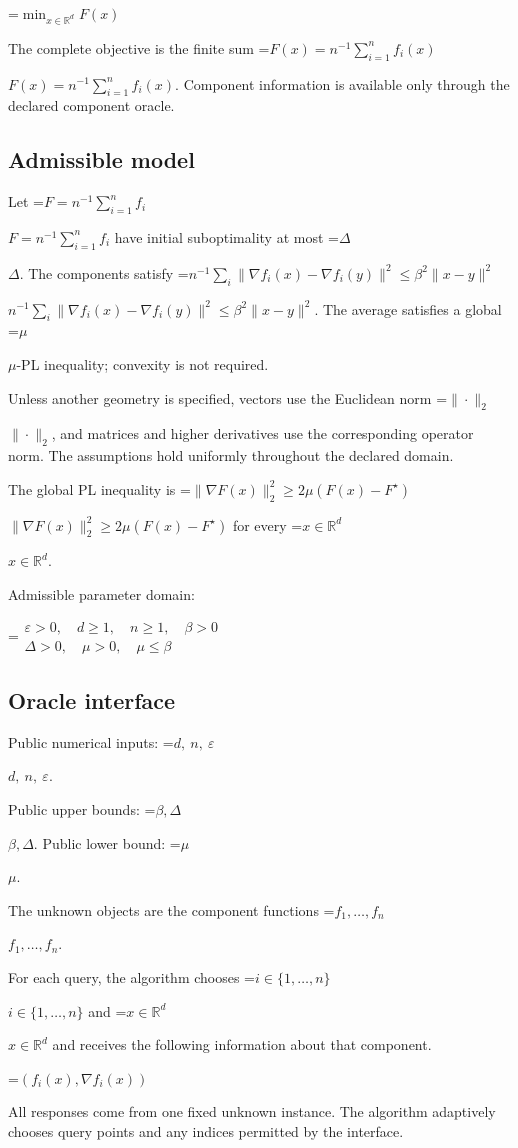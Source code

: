 \documentclass[10pt,a4paper]{article}
\newcommand{\AtlasMath}[1]{\par\begingroup\centering\setbox0=\hbox{$\displaystyle #1$}\ifdim\wd0>1.4\linewidth\typeout{ATLAS WIDE FORMULA: \the\wd0}\fi\ifdim\wd0>\linewidth\resizebox{\linewidth}{!}{\box0}\else\box0\fi\par\endgroup}
\newcommand{\AtlasInlineMath}[1]{\begingroup\setbox0=\hbox{$#1$}\ifdim\wd0>.4\linewidth\endgroup\AtlasMath{#1}\else\endgroup$#1$\fi}
\begin{document}
\AtlasMath{\min_{x\in \mathbb{R}^d}F(x)}


The complete objective is the finite sum \AtlasInlineMath{F(x)=n^{-1}\sum_{i=1}^n f_i(x)}. Component information is available only through the declared component oracle.

\subsection{Admissible model}
Let \AtlasInlineMath{F=n^{-1}\sum_{i=1}^n f_i} have initial suboptimality at most \AtlasInlineMath{\Delta}. The components satisfy \AtlasInlineMath{n^{-1}\sum_i\|\nabla f_i(x)-\nabla f_i(y)\|^2\le\beta^2\|x-y\|^2}. The average satisfies a global \AtlasInlineMath{\mu}-PL inequality; convexity is not required.

Unless another geometry is specified, vectors use the Euclidean norm \AtlasInlineMath{\|\cdot\|_2}, and matrices and higher derivatives use the corresponding operator norm. The assumptions hold uniformly throughout the declared domain.

The global PL inequality is \AtlasInlineMath{\|\nabla F(x)\|_2^2\ge2\mu(F(x)-F^\star)} for every \AtlasInlineMath{x\in\mathbb R^d}.

Admissible parameter domain:


\AtlasMath{\begin{gathered}\varepsilon > 0,\quad d \ge 1,\quad n \ge 1,\quad \beta > 0\\\Delta > 0,\quad \mu > 0,\quad \mu \le \beta\end{gathered}}


\subsection{Oracle interface}
Public numerical inputs: \AtlasInlineMath{d,\ n,\ \varepsilon}.

Public upper bounds: \AtlasInlineMath{\beta,\Delta}. Public lower bound: \AtlasInlineMath{\mu}.

The unknown objects are the component functions \AtlasInlineMath{f_1,\ldots,f_n}.

For each query, the algorithm chooses \AtlasInlineMath{i\in\{1,\ldots,n\}} and \AtlasInlineMath{x\in\mathbb R^d} and receives the following information about that component.


\AtlasMath{(f_i(x),\nabla f_i(x))}


All responses come from one fixed unknown instance. The algorithm adaptively chooses query points and any indices permitted by the interface.
\end{document}
